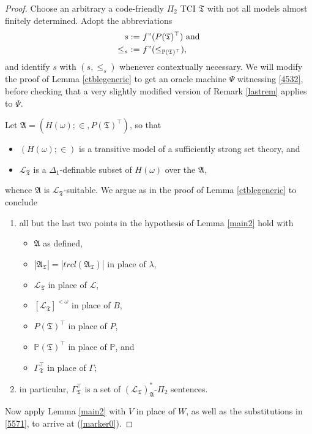 \documentclass[12pt]{article}
\numberwithin{equation}{section}
\begin{document}
\begin{proof}
Choose an arbitrary a code-friendly $\Pi_2$ TCI $\mathfrak{T}$ with not all models almost finitely determined. Adopt the abbreviations
\begin{align*}
    s := \ & f" (P(\mathfrak{T})^{\top}) \text{ and} \\
    \leq_s \ := \ & f" (\leq_{\mathbb{P}(\mathfrak{T})^{\top}}) \text{,} 
\end{align*}
and identify $s$ with $(s, \leq_s)$ whenever contextually necessary. We will modify the proof of Lemma \ref{ctblegeneric} to get an oracle machine $\Psi$ witnessing \ref{4532}, before checking that a very slightly modified version of Remark \ref{lastrem} applies to $\Psi$. 

Let $\mathfrak{A} = (H(\omega); \in, P(\mathfrak{T})^{\top})$, so that 
\begin{itemize}
    \item $(H(\omega); \in)$ is a transitive model of a sufficiently strong set theory, and
    \item $\mathcal{L}_{\mathfrak{T}}$ is a $\Delta_1$-definable subset of $H(\omega)$ over the $\mathfrak{A}$,
\end{itemize}
whence $\mathfrak{A}$ is $\mathcal{L}_{\mathfrak{T}}$-suitable. We argue as in the proof of Lemma \ref{ctblegeneric} to conclude 
\begin{enumerate}[label=(\Roman*)]
    \item\label{5571} all but the last two points in the hypothesis of Lemma \ref{main2} hold with
    \begin{itemize}
        \item $\mathfrak{A}$ as defined,
        \item $|\mathfrak{A}_{\mathfrak{T}}| = |trcl(\mathfrak{A}_{\mathfrak{T}})|$ in place of $\lambda$,
        \item $\mathcal{L}_{\mathfrak{T}}$ in place of $\mathcal{L}$,
        \item $[\mathcal{L}_{\mathfrak{T}}]^{< \omega}$ in place of $B$,
        \item $P(\mathfrak{T})^{\top}$ in place of $P$,
        \item $\mathbb{P}(\mathfrak{T})^{\top}$ in place of $\mathbb{P}$, and
        \item $\Gamma_{\mathfrak{T}}^{\top}$ in place of $\Gamma$;
    \end{itemize} 
    \item\label{5572} in particular, $\Gamma_{\mathfrak{T}}^{\top}$ is a set of $(\mathcal{L}_{\mathfrak{T}})^*_{\mathfrak{A}}$-$\Pi_2$ sentences.
\end{enumerate}
Now apply Lemma \ref{main2} with $V$ in place of $W$, as well as the substitutions in \ref{5571}, to arrive at (\ref{marker0}).


\end{proof}
\end{document}
